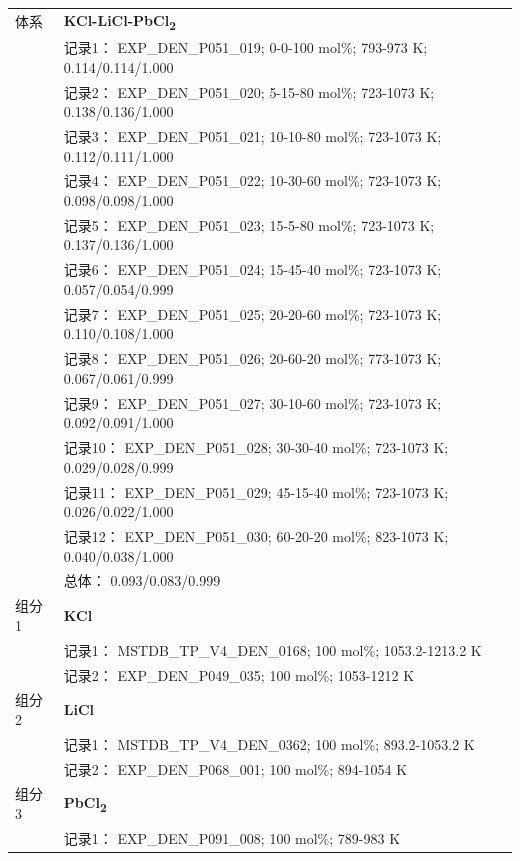 \documentclass[12pt]{article}
\begin{document}
{\begin{longtable}[]{@{}
  >{\raggedright\arraybackslash}p{}
  >{\raggedright\arraybackslash}p{}@{}}
\midrule
体系 & \textbf{KCl-LiCl-PbCl\textsubscript{2}} \\
 & 记录1： EXP\_DEN\_P051\_019; 0-0-100 mol\%; 793-973 K; 0.114/0.114/1.000 \\
 & 记录2： EXP\_DEN\_P051\_020; 5-15-80 mol\%; 723-1073 K; 0.138/0.136/1.000 \\
 & 记录3： EXP\_DEN\_P051\_021; 10-10-80 mol\%; 723-1073 K; 0.112/0.111/1.000 \\
 & 记录4： EXP\_DEN\_P051\_022; 10-30-60 mol\%; 723-1073 K; 0.098/0.098/1.000 \\
 & 记录5： EXP\_DEN\_P051\_023; 15-5-80 mol\%; 723-1073 K; 0.137/0.136/1.000 \\
 & 记录6： EXP\_DEN\_P051\_024; 15-45-40 mol\%; 723-1073 K; 0.057/0.054/0.999 \\
 & 记录7： EXP\_DEN\_P051\_025; 20-20-60 mol\%; 723-1073 K; 0.110/0.108/1.000 \\
 & 记录8： EXP\_DEN\_P051\_026; 20-60-20 mol\%; 773-1073 K; 0.067/0.061/0.999 \\
 & 记录9： EXP\_DEN\_P051\_027; 30-10-60 mol\%; 723-1073 K; 0.092/0.091/1.000 \\
 & 记录10： EXP\_DEN\_P051\_028; 30-30-40 mol\%; 723-1073 K; 0.029/0.028/0.999 \\
 & 记录11： EXP\_DEN\_P051\_029; 45-15-40 mol\%; 723-1073 K; 0.026/0.022/1.000 \\
 & 记录12： EXP\_DEN\_P051\_030; 60-20-20 mol\%; 823-1073 K; 0.040/0.038/1.000 \\
 & 总体： 0.093/0.083/0.999  \\

组分 1  & \textbf{KCl} \\
 & 记录1： MSTDB\_TP\_V4\_DEN\_0168; 100 mol\%; 1053.2-1213.2 K \\
 & 记录2： EXP\_DEN\_P049\_035; 100 mol\%; 1053-1212 K  \\

组分 2  & \textbf{LiCl} \\
 & 记录1： MSTDB\_TP\_V4\_DEN\_0362; 100 mol\%; 893.2-1053.2 K \\
 & 记录2： EXP\_DEN\_P068\_001; 100 mol\%; 894-1054 K  \\

组分 3  & \textbf{PbCl\textsubscript{2}} \\
 & 记录1： EXP\_DEN\_P091\_008; 100 mol\%; 789-983 K  \\


\end{longtable}}
\end{document}
